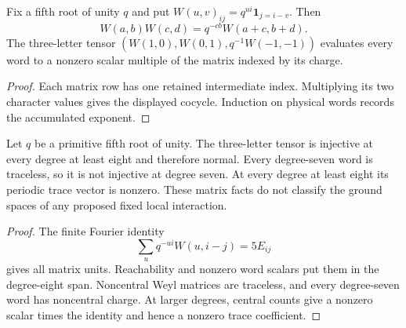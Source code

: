 \begin{lemma}
    \label{lem:short_volume_weyl_products}
    \leanok
    Fix a fifth root of unity $q$ and put
    $W(u,v)_{ij}=q^{ui}\mathbf1_{j=i-v}$. Then
    \[
        W(a,b)W(c,d)=q^{-cb}W(a+c,b+d).
    \]
    The three-letter tensor
    $(W(1,0),W(0,1),q^{-1}W(-1,-1))$ evaluates every word to a
    nonzero scalar multiple of the matrix indexed by its charge.
\end{lemma}
\begin{proof}\leanok
    Each matrix row has one retained intermediate index.
    Multiplying its two character values gives the displayed cocycle.
    Induction on physical words records the accumulated exponent.
\end{proof}

\begin{lemma}
    \label{lem:short_volume_weyl_normality}
    \leanok
    Let $q$ be a primitive fifth root of unity.
    The three-letter tensor is injective at every degree at least eight and
    therefore normal. Every degree-seven word is traceless, so it is
    not injective at degree seven. At every degree at least eight its
    periodic trace vector is nonzero. These matrix facts do not classify
    the ground spaces of any proposed fixed local interaction.
\end{lemma}
\begin{proof}\leanok
    The finite Fourier identity
    \[
        \sum_u q^{-ui}W(u,i-j)=5E_{ij}
    \]
    gives all matrix units. Reachability and nonzero word scalars put
    them in the degree-eight span. Noncentral Weyl matrices are
    traceless, and every degree-seven word has noncentral charge.
    At larger degrees, central counts give a nonzero scalar times
    the identity and hence a nonzero trace coefficient.
\end{proof}

